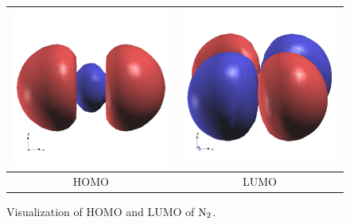 \documentclass[12pt,english]{paper}
\providecommand{\tabularnewline}{\\}
\begin{document}
\begin{figure}[H]
\noindent \begin{centering}
\begin{tabular}{|c|c|}
\hline
\includegraphics[scale=0.2]{images/N2_MO5} & \includegraphics[scale=0.2]{images/N2_MO6}\tabularnewline
\hline
HOMO & LUMO\tabularnewline
\hline
\end{tabular}
\par\end{centering}

\caption{Visualization of HOMO and LUMO of $\ce{N_{2}}$.\label{fig:N2-homo-lumo}}
\end{figure}
\end{document}
